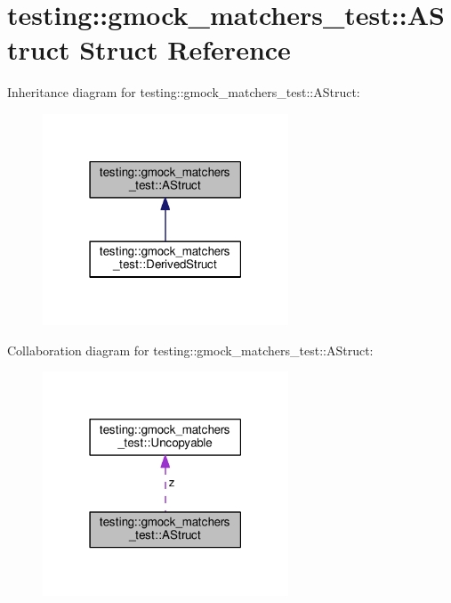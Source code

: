 \hypertarget{structtesting_1_1gmock__matchers__test_1_1AStruct}{}\section{testing\+:\+:gmock\+\_\+matchers\+\_\+test\+:\+:A\+Struct Struct Reference}
\label{structtesting_1_1gmock__matchers__test_1_1AStruct}


Inheritance diagram for testing\+:\+:gmock\+\_\+matchers\+\_\+test\+:\+:A\+Struct\+:
\nopagebreak
\begin{figure}[H]
\begin{center}
\leavevmode
\includegraphics[width=207pt]{structtesting_1_1gmock__matchers__test_1_1AStruct__inherit__graph}
\end{center}
\end{figure}


Collaboration diagram for testing\+:\+:gmock\+\_\+matchers\+\_\+test\+:\+:A\+Struct\+:
\nopagebreak
\begin{figure}[H]
\begin{center}
\leavevmode
\includegraphics[width=207pt]{structtesting_1_1gmock__matchers__test_1_1AStruct__coll__graph}
\end{center}
\end{figure}
